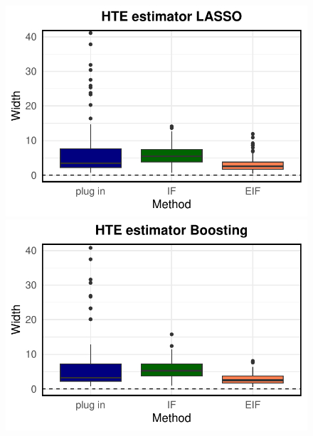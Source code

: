 \begin{figure}[ht]
        \centering
        \begin{minipage}{0.3\textwidth}
                \centering
                \includegraphics[clip, trim = 0cm 0cm 0cm 0cm, width = \textwidth]{plot/ACIC_linear_propensity_linear_HTE_CI_width_LASSO.pdf}
        \end{minipage}
        \begin{minipage}{0.3\textwidth}
                \centering
                \includegraphics[clip, trim = 0cm 0cm 0cm 0cm, width = \textwidth]{plot/ACIC_linear_propensity_linear_HTE_CI_width_Boosting.pdf}
        \end{minipage}
        \begin{minipage}{0.3\textwidth}
                \centering

\end{minipage}
\end{figure}
